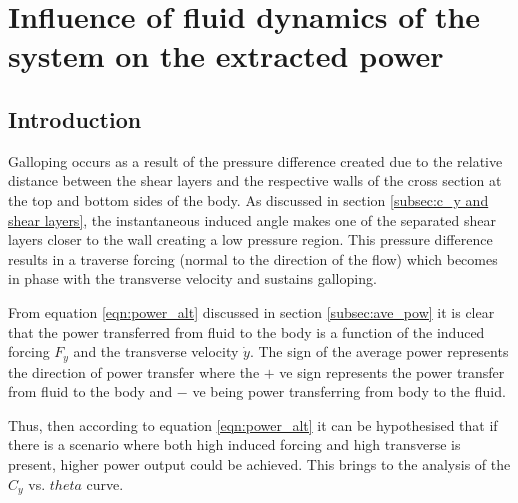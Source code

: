 \chapter{Influence of fluid dynamics of the system on the extracted power}

\section{Introduction}

Galloping occurs as a result of the pressure difference created due to the relative distance between the shear layers and the respective walls of the cross section at the top and bottom sides of the body. As discussed in section \ref{subsec:c_y and shear layers}, the instantaneous induced angle makes one of the separated shear layers closer to the wall creating a low pressure region. This pressure difference results in a traverse forcing (normal to the direction of the flow) which becomes in phase with the transverse velocity and sustains galloping. 

From equation \ref{eqn:power_alt} discussed in section \ref{subsec:ave_pow} it is clear that the power transferred from fluid to the body is a function of the induced forcing $F_y$ and the transverse velocity $\dot{y}$. The sign of the average power represents the direction of power transfer where the $+$ ve sign represents the power transfer from fluid to the body and $-$ ve being power transferring from body to the fluid. 

Thus, then  according to equation \ref{eqn:power_alt} it can be hypothesised that if there is a scenario where both high induced forcing and high transverse is present, higher power output could be achieved. This brings to the analysis of the $C_y$ vs. $theta$ curve.           

